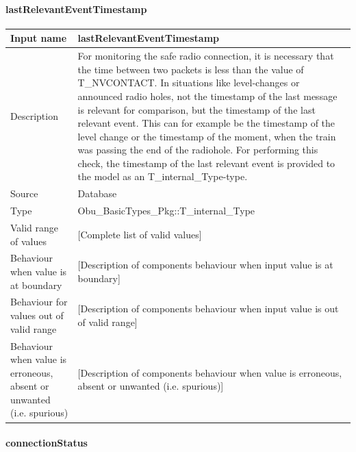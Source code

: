 \paragraph{lastRelevantEventTimestamp}

\begin{longtable}{p{}p{}}
\toprule
Input name				& lastRelevantEventTimestamp \\
\midrule
Description				& For monitoring the safe radio connection, it is necessary that the time between two packets is less than the value of {T\_NVCONTACT}.\newline
In situations like level-changes or announced radio holes, not the timestamp of the last message is relevant for comparison, but the timestamp of the last relevant event. This can for example be the timestamp of the level change or the timestamp of the moment, when the train was passing the end of the radiohole.\newline
For performing this check, the timestamp of the last relevant event is provided to the model as an {T\_internal\_Type}-type. \\
\midrule
Source					& Database \\ 
\midrule
Type					& Obu\_BasicTypes\_Pkg::T\_internal\_Type \\
\midrule
Valid range of values	& [Complete list of valid values] \\
\midrule
Behaviour when value is at boundary	& [Description of components behaviour when input value is at boundary] \\
\midrule
Behaviour for values out of valid range	& [Description of components behaviour when input value is out of valid range] \\
\midrule
Behaviour when value is erroneous, absent or unwanted (i.e. spurious) & [Description of components behaviour when value is erroneous, absent or unwanted (i.e. spurious)] \\
\bottomrule
\end{longtable}


\paragraph{connectionStatus}

